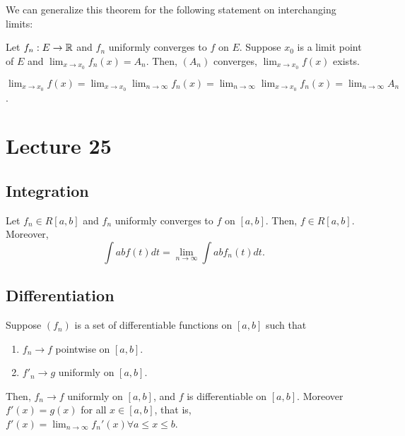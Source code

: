 \documentclass{book}
\begin{document}
We can generalize this theorem for the following statement on interchanging limits:

Let $f_n : E \to \mathbb{R}$ and $f_n$ uniformly converges to $f$ on $E$. Suppose $x_0$ is a limit point of $E$ and $\lim_{x \to x_0} f_n(x) = A_n$. Then, $(A_n)$ converges, $\lim_{x \to x_0} f(x)$ exists.

$\lim_{x \to x_0} f(x) = \lim_{x \to x_0} \lim_{n \to \infty} f_n(x) = \lim_{n \to \infty} \lim_{x \to x_0} f_n(x) = \lim_{n \to \infty} A_n$.

\section{Lecture 25}
\subsection{Integration}
\begin{thm}
    Let $f_n \in R[a, b]$ and $f_n$ uniformly converges to $f$ on $[a, b]$. Then, $f \in R[a, b]$. Moreover, \[\int{a}{b} f(t)dt = \lim_{n \to \infty} \int{a}{b} f_n(t)dt.\] 
\end{thm}

\subsection{Differentiation}
\begin{thm}[Rudin 7.17]
    Suppose $(f_n)$ is a set of differentiable functions on $[a, b]$ such that 
    \begin{enumerate}
        \item $f_n \to f$ pointwise on $[a, b]$. 
        \item $f'_n \to g$ uniformly on $[a, b]$.
    \end{enumerate}

    Then, $f_n \to f$ uniformly on $[a, b]$, and $f$ is differentiable on $[a, b]$. Moreover $f'(x) = g(x)$ for all $x \in [a, b]$, that is, $f'(x) = \lim_{n \to \infty} f_n'(x) \forall a \leq x \leq b$.
\end{thm}
\end{document}

